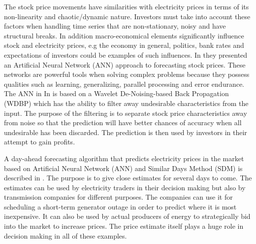 The stock price movements have similarities with electricity prices in terms of its non-linearity and chaotic/dynamic nature. Investors must take into account these factors when handling time series that are non-stationary, noisy and have structural breaks\cite{stockForecasting}. In addition macro-economical elements significantly influence stock and electricity prices, e.g the economy in general, politics, bank rates and expectations of investors could be examples of such influences. In \cite{stockForecasting} they presented an Artificial Neural Network (ANN) approach to forecasting stock prices. These networks are powerful tools when solving complex problems because they possess qualities such as learning, generalizing, parallel processing and error endurance. The ANN in In \cite{stockForecasting} is based on a Wavelet De-Noising-based Back Propagation (WDBP) which has the ability to filter away undesirable characteristics from the input. The purpose of the filtering is to separate stock price characteristics away from noise so that the prediction will have better chances of accuracy when all undesirable has been discarded. The prediction is then used by investors in their attempt to gain profits. 

A day-ahead forecasting algorithm that predicts electricity prices in the market based on Artificial Neural Network (ANN) and Similar Days Method (SDM) is described in \cite{pjmForecast}. The purpose is to give close estimates for several days to come. The estimates can be used by electricity traders in their decision making but also by transmission companies for different purposes. The companies can use it for scheduling a short-term generator outage in order to predict where it is most inexpensive. It can also be used by actual producers of energy to strategically bid into the market to increase prices. The price estimate itself plays a huge role in decision making in all of these examples.

